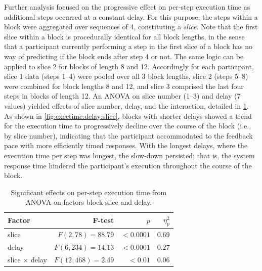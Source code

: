 \documentclass[10pt,letterpaper]{article}
\begin{document}
Further analysis focused on the progressive effect on per-step execution time as additional steps occurred at a constant delay.
For this purpose, the steps within a block were aggregated over sequences of 4, constituting a \emph{slice}.
Note that the first slice within a block is procedurally identical for all block lengths, in the sense that a participant currently performing a step in the first slice of a block has no way of predicting if the block ends after step 4 or not.
The same logic can be applied to slice 2 for blocks of length 8 and 12.
Accordingly for each participant, slice 1 data (steps 1--4) were pooled over all 3 block lengths, slice 2 (steps 5--8) were combined for block lengths 8 and 12, and slice 3 comprised the last four steps in blocks of length 12.
An ANOVA on slice number (1--3) and delay (7 values) yielded effects of slice number, delay, and the interaction, detailed in \cref{tab:anova:exectime:slice}.
As shown in \cref{fig:exectime:delay:slice}, blocks with shorter delays showed a trend for the execution time to progressively decline over the course of the block (i.e., by slice number), indicating that the participant accommodated to the feedback pace with more efficiently timed responses.
With the longest delays, where the execution time per step was longest, the slow-down persisted; that is, the system response time hindered the participant's execution throughout the course of the block.

\begin{table}[h]
  \centering
  \caption{Significant effects on per-step execution time from ANOVA on factors block slice and delay.}\label{tab:anova:exectime:slice}
  \setlength{\tabcolsep}{0pt} %
  \begin{tabular*}{\columnwidth}{@{\extracolsep{\fill}\quad}lrrr@{}}
    \toprule
    \textbf{Factor} & \textbf{F-test} & \( p \) & \( \eta^{2}_{p} \) \\
    \midrule
    slice         &   \( F(2, 78) = 88.79 \) &  \( < 0.0001 \) &         \( 0.69 \) \\
    delay         &  \( F(6, 234) = 14.13 \) &  \( < 0.0001 \) &         \( 0.27 \) \\
    slice \( \times \) delay &  \( F(12, 468) = 2.49 \) &    \( < 0.01 \) &         \( 0.06 \) \\
    \bottomrule
  \end{tabular*}%
\end{table}
\end{document}
